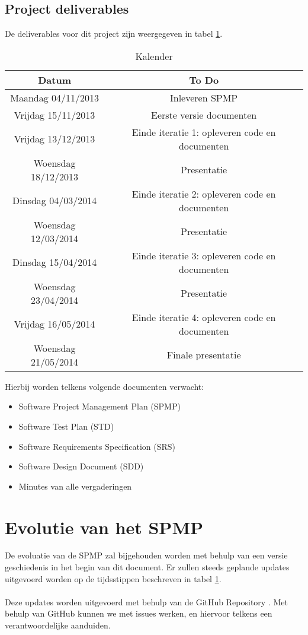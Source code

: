 \subsection{Project deliverables}
De deliverables voor dit project zijn weergegeven in tabel \ref{tab:kalender}.
\begin{table}[H]
  \centering
  \caption{Kalender}
    \begin{tabular}{c|c}
    \textbf{Datum} & \textbf{To Do} \\
    \hline
    Maandag 04/11/2013 & Inleveren SPMP \\
    Vrijdag 15/11/2013 & Eerste versie documenten \\
    Vrijdag 13/12/2013 & Einde iteratie 1: opleveren code en documenten \\
    Woensdag 18/12/2013 & Presentatie \\
    \hline
    \hline
    Dinsdag 04/03/2014 & Einde iteratie 2: opleveren code en documenten \\
    Woensdag 12/03/2014 & Presentatie \\
    Dinsdag 15/04/2014 & Einde iteratie 3: opleveren code en documenten \\
    Woensdag 23/04/2014 & Presentatie \\
    Vrijdag 16/05/2014 & Einde iteratie 4: opleveren code en documenten \\
    Woensdag 21/05/2014 & Finale presentatie \\
    \end{tabular}
  \label{tab:kalender}
\end{table}
Hierbij worden telkens volgende documenten verwacht:
\begin{itemize}
	\item Software Project Management Plan (SPMP)
	\item Software Test Plan (STD)
	\item Software Requirements Specification (SRS)
	\item Software Design Document (SDD)
	\item Minutes van alle vergaderingen
\end{itemize}

\section{Evolutie van het SPMP}
De evoluatie van de SPMP zal bijgehouden worden met behulp van een versie geschiedenis in het begin van dit document. Er zullen steeds geplande updates uitgevoerd worden op de tijdsstippen beschreven in tabel \ref{tab:kalender}. 
\\
\\
Deze updates worden uitgevoerd met behulp van de GitHub Repository \cite{GitHubRepository}. Met behulp van GitHub kunnen we met issues werken, en hiervoor telkens een verantwoordelijke aanduiden.